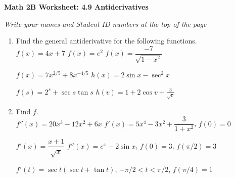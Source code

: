 \documentclass[12pt]{article}
\begin{document}
\begin{center}
	\textbf{Math 2B Worksheet: 4.9 Antiderivatives}
\end{center}

\emph{Write your names and Student ID numbers at the top of the page}

\begin{enumerate}
\item Find the general antiderivative for the following functions.\\
$f(x)=4x+7$
\hspace{2cm}
$f(x)=e^{2}$
\hspace{2cm}
$f(x)=\dfrac{-7}{\sqrt{1-x^2}}$

\vfill


$f(x)=7x^{2/5}+8x^{-4/5}$
\hspace{2cm}
$h(x)=2\sin x-\sec^{2}x$

\vfill

$f(s)=2^{s}+\sec s\tan s$
\hspace{2cm}
$h(v)=1+2\cos v +\frac{3}{\sqrt{v}}$

\vfill
\newpage

\item Find $f$.\\
$f''(x)=20x^{3}-12x^{2}+6x$
\hspace{2cm}
$f'(x)=5x^{4}-3x^{2}+\dfrac{3}{1+x^2}$, $f(0)=0$

\vfill

$f'(x)=\dfrac{x+1}{\sqrt{x}}$
\hspace{2cm}
$f''(x)=e^{x}-2\sin x$, $f(0)=3$, $f(\pi/2)=3$

\vfill

$f'(t)=\sec t(\sec t+\tan t)$, $-\pi/2<t<\pi/2$, $f(\pi/4)=1$

\vfill

\end{enumerate}
\end{document}
